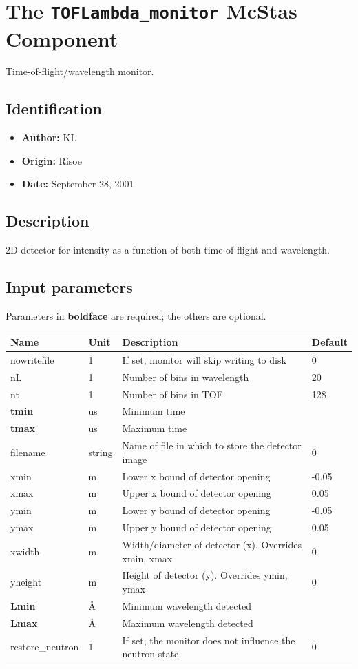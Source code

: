 \section{The \texttt{TOFLambda\_monitor} McStas Component}
Time-of-flight/wavelength monitor.

\subsection*{Identification}
\begin{itemize}
  \item \textbf{Author:} KL
  \item \textbf{Origin:} Risoe
  \item \textbf{Date:} September 28, 2001
\end{itemize}

\subsection*{Description}
2D detector for intensity as a function of both time-of-flight and wavelength.

\subsection*{Input parameters}
Parameters in \textbf{boldface} are required; the others are optional.

\begin{longtable}{p{}p{}p{}p{}}
\toprule
\textbf{Name} & \textbf{Unit} & \textbf{Description} & \textbf{Default} \\
\midrule
\endhead
nowritefile & 1 & If set, monitor will skip writing to disk & 0 \\
nL & 1 & Number of bins in wavelength & 20 \\
nt & 1 & Number of bins in TOF & 128 \\
\textbf{tmin} & us & Minimum time &  \\
\textbf{tmax} & us & Maximum time &  \\
filename & string & Name of file in which to store the detector image & 0 \\
xmin & m & Lower x bound of detector opening & -0.05 \\
xmax & m & Upper x bound of detector opening & 0.05 \\
ymin & m & Lower y bound of detector opening & -0.05 \\
ymax & m & Upper y bound of detector opening & 0.05 \\
xwidth & m & Width/diameter of detector (x). Overrides xmin, xmax & 0 \\
yheight & m & Height of detector (y). Overrides ymin, ymax & 0 \\
\textbf{Lmin} & \AA{} & Minimum wavelength detected &  \\
\textbf{Lmax} & \AA{} & Maximum wavelength detected &  \\
restore\_neutron & 1 & If set, the monitor does not influence the neutron state & 0 \\
\bottomrule
\end{longtable}

